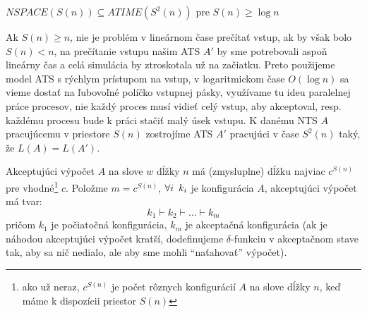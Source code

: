 \begin{veta}
  \label{alter_veta_nspaceatime}
  $NSPACE(S(n))\subseteq ATIME(S^2(n))$ pre
  $S(n)\geq\log n$
\end{veta}

\begin{dokaz}
  Ak $S(n)\geq n$, nie je problém v lineárnom čase prečítať vstup,
  ak by však bolo $S(n)<n$, na prečítanie vstupu našim ATS $A'$ by
  sme potrebovali aspoň lineárny čas a celá simulácia by ztroskotala
  už na začiatku. Preto použijeme model ATS s rýchlym prístupom na
  vstup, v logaritmickom čase $O(\log n)$ sa vieme dostať na
  ľubovoľné políčko vstupnej pásky, využívame tu ideu paralelnej
  práce procesov, nie každý proces musí vidieť celý vstup, aby
  akceptoval, resp. každému procesu bude k práci stačiť malý úsek
  vstupu. K danému NTS $A$ pracujúcemu v priestore $S(n)$ zostrojíme
  ATS $A'$ pracujúci v čase $S^2(n)$ taký, že $L(A)=L(A')$.

  \smallskip
  Akceptujúci výpočet $A$ na slove $w$ dĺžky $n$ má (zmysluplne)
  dĺžku najviac $c^{S(n)}$ pre vhodné\footnote{ako už neraz,
  $c^{S(n)}$ je počet rôznych konfigurácií $A$ na slove dĺžky $n$,
  keď máme k dispozícii priestor $S(n)$} $c$. Položme $m=c^{S(n)}$,
  $\forall i\enspace k_i$ je konfigurácia $A$, akceptujúci výpočet má
  tvar:
  \[
  k_1\vdash k_2\vdash\dots\vdash k_m
  \]
  pričom $k_1$ je počiatočná konfigurácia, $k_m$ je akceptačná
  konfigurácia (ak je náhodou akceptujúci výpočet kratší,
  dodefinujeme $\delta$-funkciu v akceptačnom stave tak, aby sa nič
  nedialo, ale aby sme mohli ``naťahovať'' výpočet).


\end{dokaz}

